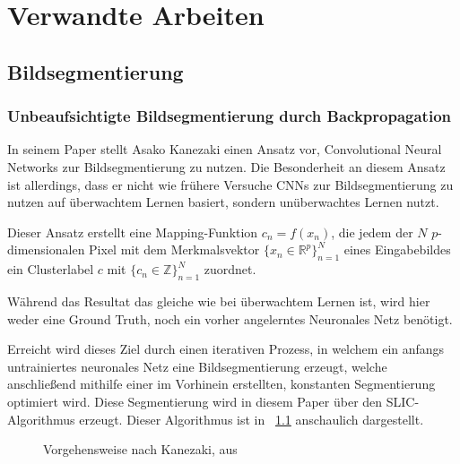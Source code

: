 \chapter{Verwandte Arbeiten}
\label{chap:verwarbeiten}

\section{Bildsegmentierung}
\label{sec:segmentation}

\subsection{Unbeaufsichtigte Bildsegmentierung durch Backpropagation}
\label{ssec:kanezaki}
In seinem Paper \cite{kanezaki} stellt Asako Kanezaki einen Ansatz vor, Convolutional Neural Networks zur Bildsegmentierung zu nutzen. Die Besonderheit an diesem Ansatz ist allerdings, dass er nicht wie frühere Versuche CNNs zur Bildsegmentierung zu nutzen auf überwachtem Lernen basiert, sondern unüberwachtes Lernen nutzt.

Dieser Ansatz erstellt eine Mapping-Funktion $c_n=f(x_n)$, die jedem der $N$ $p$-dimensionalen Pixel mit dem Merkmalsvektor $\{x_n\in\mathbb{R}^p\}_{n=1}^N$ eines Eingabebildes ein Clusterlabel $c$ mit $\{c_n\in\mathbb{Z}\}_{n=1}^N$ zuordnet.

Während das Resultat das gleiche wie bei überwachtem Lernen ist, wird hier weder eine Ground Truth, noch ein vorher angelerntes Neuronales Netz benötigt.

Erreicht wird dieses Ziel durch einen iterativen Prozess, in welchem ein anfangs untrainiertes neuronales Netz eine Bildsegmentierung erzeugt, welche anschließend mithilfe einer im Vorhinein erstellten, konstanten Segmentierung optimiert wird. Diese Segmentierung wird in diesem Paper über den SLIC-Algorithmus\cite{slic} erzeugt. Dieser Algorithmus ist in \figurename~\ref{fig:Kan18_01} anschaulich dargestellt. 

\begin{figure}[h]
	\caption{Vorgehensweise nach Kanezaki, aus \cite{kanezaki}}
	\label{fig:Kan18_01}
\end{figure}

